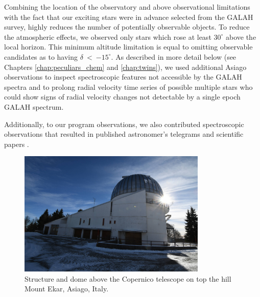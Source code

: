Combining the location of the observatory and above observational limitations with the fact that our exciting stars were in advance selected from the GALAH survey, highly reduces the number of potentially observable objects. To reduce the atmospheric effects, we observed only stars which rose at least $30^\circ$ above the local horizon. This minimum altitude limitation is equal to omitting observable candidates as to having $\delta$~<~$-15^\circ$. As described in more detail below (see Chapters \ref{chap:peculiars_chem} and \ref{chap:twins}), we used additional Asiago observations to inspect spectroscopic features not accessible by the GALAH spectra and to prolong radial velocity time series of possible multiple stars who could show signs of radial velocity changes not detectable by a single epoch GALAH spectrum.

Additionally, to our program observations, we also contributed spectroscopic observations that resulted in published astronomer's telegrams \cite{2019ATel13340....1M} and scientific papers \cite{2019MNRAS.488.5536M}.

\begin{figure}
	\centering
	\includegraphics[width=0.8\textwidth]{DSC_8199.JPG}
	\caption{Structure and dome above the Copernico telescope on top the hill Mount Ekar, Asiago, Italy.}
	\label{fig:copernico_obs}
\end{figure}